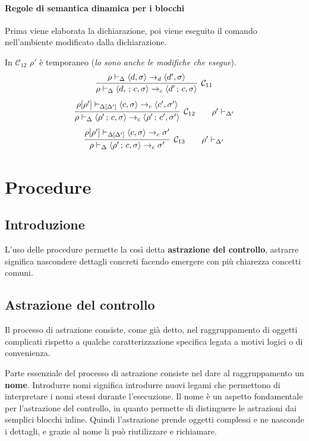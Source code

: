 \documentclass[oneside,a4paper,11pt]{book}
\theoremstyle{italicstyle}
\theoremstyle{normStyle}
\begin{document}
\subsubsection{Regole di semantica dinamica per i blocchi}
Prima viene elaborata la dichiarazione, poi viene eseguito il comando nell'ambiente 
modificato dalla dichiarazione.

In $\mathcal{C}_{12}$ $\rho'$ è temporaneo (\textit{lo sono anche le modifiche 
che esegue}).
\[
  \infer[\mathcal{C}_{11}]
  {
    \rho \vdash_\Delta \langle d,\,;\,c, \sigma\rangle \rightarrow_c \langle d'\,;\,c ,\sigma\rangle
  }
  {
    \rho \vdash_\Delta \langle d, \sigma\rangle \rightarrow_d \langle d' ,\sigma\rangle
  }
\]
\[
  \infer[\mathcal{C}_{12}\qquad\rho'\vdash_{\Delta'}]
  {
    \rho \vdash_\Delta \langle \rho'\,;\,c, \sigma\rangle \rightarrow_c \langle \rho'\,;\,c' ,\sigma'\rangle
  }
  {
    \rho[\rho'] \vdash_{\Delta[\Delta']} \langle c, \sigma\rangle \rightarrow_c \langle c' ,\sigma'\rangle
  }
\]
\[
  \infer[\mathcal{C}_{13}\qquad\rho'\vdash_{\Delta'}]
  {
    \rho \vdash_\Delta \langle \rho'\,;\,c, \sigma\rangle \rightarrow_c \sigma'
  }
  {
    \rho[\rho'] \vdash_{\Delta[\Delta']} \langle c, \sigma\rangle \rightarrow_c \sigma'
  }
\]
\chapter{Procedure}
\section{Introduzione}
L'uso delle procedure permette la così detta \textbf{astrazione del controllo}, astrarre 
significa nascondere dettagli concreti facendo emergere con più chiarezza concetti comuni.
\section{Astrazione del controllo}
Il processo di astrazione consiste, come già detto, nel raggruppamento 
di oggetti complicati rispetto a qualche caratterizzazione specifica legata a motivi logici 
o di convenienza.

Parte essenziale del processo di astrazione consiste nel dare al raggruppamento 
un \textbf{nome}. Introdurre nomi significa introdurre nuovi legami che permettono 
di interpretare i nomi stessi durante l'esecuzione.
Il nome è un aspetto fondamentale per l'astrazione del controllo, in quanto permette di distinguere le astrazioni dai semplici blocchi 
inline. Quindi l'astrazione prende oggetti complessi e ne nasconde i dettagli, e grazie al nome 
li può riutilizzare e richiamare.
\end{document}
